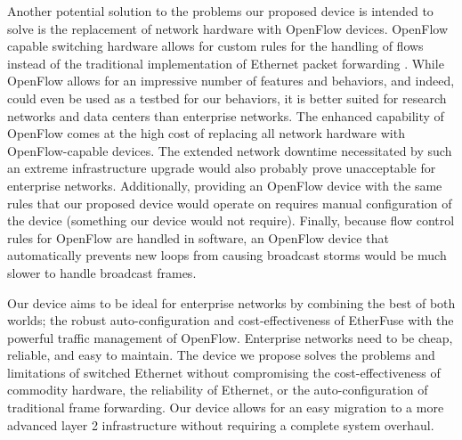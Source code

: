 \documentclass{article}
\begin{document}
\begin{multicols}{2}
	Another potential solution to the problems our proposed device is intended to solve is the replacement of network hardware with OpenFlow devices.
	OpenFlow capable switching hardware allows for custom rules for the handling of flows instead of the traditional implementation of Ethernet packet forwarding \cite{openflow}.
	While OpenFlow allows for an impressive number of features and behaviors, and indeed, could even be used as a testbed for our behaviors, it is better suited for research networks and data centers than enterprise networks.
	The enhanced capability of OpenFlow comes at the high cost of replacing all network hardware with OpenFlow-capable devices.
	The extended network downtime necessitated by such an extreme infrastructure upgrade would also probably prove unacceptable for enterprise networks.
	Additionally, providing an OpenFlow device with the same rules that our proposed device would operate on requires manual configuration of the device (something our device would not require).
	Finally, because flow control rules for OpenFlow are handled in software, an OpenFlow device that automatically prevents new loops from causing broadcast storms would be much slower to handle broadcast frames.

	Our device aims to be ideal for enterprise networks by combining the best of both worlds; the robust auto-configuration and cost-effectiveness of EtherFuse with the powerful traffic management of OpenFlow.
	Enterprise networks need to be cheap, reliable, and easy to maintain.
	The device we propose solves the problems and limitations of switched Ethernet without compromising the cost-effectiveness of commodity hardware, the reliability of Ethernet, or the auto-configuration of traditional frame forwarding.
	Our device allows for an easy migration to a more advanced layer 2 infrastructure without requiring a complete system overhaul.
\end{multicols}
\newpage


\end{document}
